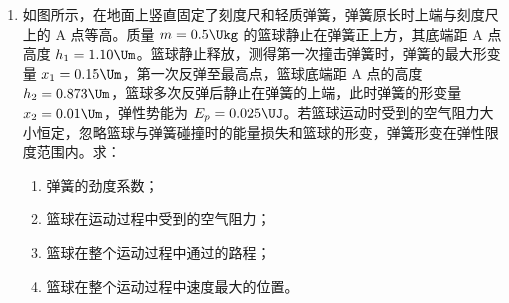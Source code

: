 \documentclass[\gkver]{gaokaozhenti}
\begin{document}
\begin{enumerate}
{（2）小滑块在 D 处水平飞出，做平抛运动，由
$L = v_D t$，$h_2 = \frac{1}{2}gt^{2}$，
解得 $v_D = 1\Ums$。

（3）小滑块动能减小，重力势能也减小，机械能不守恒，所以细管道 BCD 内壁不光滑。
}

\item
如图所示，在地面上竖直固定了刻度尺和轻质弹簧，弹簧原长时上端与刻度尺上的 A 点等高。质量 $m = 0.5\Ukg$ 的篮球静止在弹簧正上方，其底端距 A 点高度 $h_1 = 1.10\Um$。篮球静止释放，测得第一次撞击弹簧时，弹簧的最大形变量 $x_1 = 0.15\Um$，第一次反弹至最高点，篮球底端距 A 点的高度 $h_2 = 0.873\Um$，篮球多次反弹后静止在弹簧的上端，此时弹簧的形变量 $x_2 = 0.01\Um$，弹性势能为 $E_p = 0.025\UJ$。若篮球运动时受到的空气阻力大小恒定，忽略篮球与弹簧碰撞时的能量损失和篮球的形变，弹簧形变在弹性限度范围内。求：
\begin{enumerate}
	\item
	弹簧的劲度系数；
	\item
	篮球在运动过程中受到的空气阻力；
	\item
	篮球在整个运动过程中通过的路程；
	\item
	篮球在整个运动过程中速度最大的位置。
\end{enumerate}


\jdanswer{
\begin{enumerate}
	\item
	$500\UNm$

	\item
	$0.5\UN$

	\item
	$11.05\Um$

	\item
	$0.009\Um$

\end{enumerate}
}


\end{enumerate}
\end{document}
